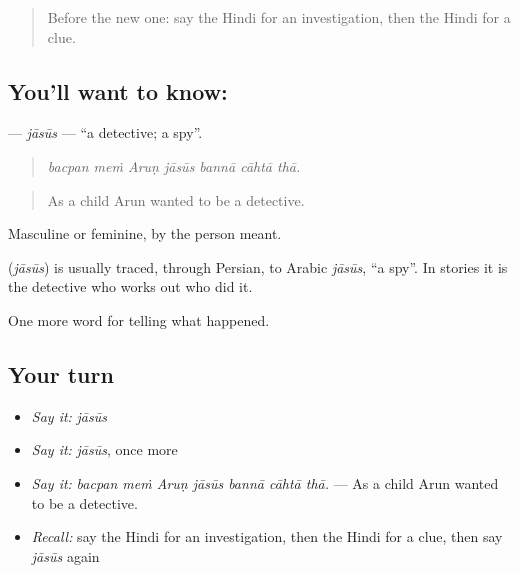 \label{lesson:HI-C294-jasus}



\begin{quote}
Before the new one: say the Hindi for an investigation, then the Hindi for a clue.
\end{quote}

\subsection*{You'll want to know: }
\textbf{} — \emph{jāsūs} — \textquotedblleft{}a detective; a spy\textquotedblright{}.

\begin{quote}
      
\end{quote}

\begin{quote}
\emph{bacpan meṁ Aruṇ jāsūs bannā cāhtā thā.}
\end{quote}

\begin{quote}
As a child Arun wanted to be a detective.
\end{quote}

Masculine or feminine, by the person meant.

\begin{cousinweb}
\textbf{} (\emph{jāsūs}) is usually traced, through Persian, to Arabic \emph{jāsūs}, \textquotedblleft{}a spy\textquotedblright{}. In stories it is the detective who works out who did it.
\end{cousinweb}

\begin{grammarlens}[title={What you've built}]
One more word for telling what happened.
\end{grammarlens}

\subsection*{Your turn}
\begin{itemize}
\raggedright
  \item \emph{Say it:} \emph{jāsūs}
  \item \emph{Say it:} \emph{jāsūs}, once more
  \item \emph{Say it:} \emph{bacpan meṁ Aruṇ jāsūs bannā cāhtā thā.} — As a child Arun wanted to be a detective.
  \item \emph{Recall:} say the Hindi for an investigation, then the Hindi for a clue, then say \emph{jāsūs} again
\end{itemize}

